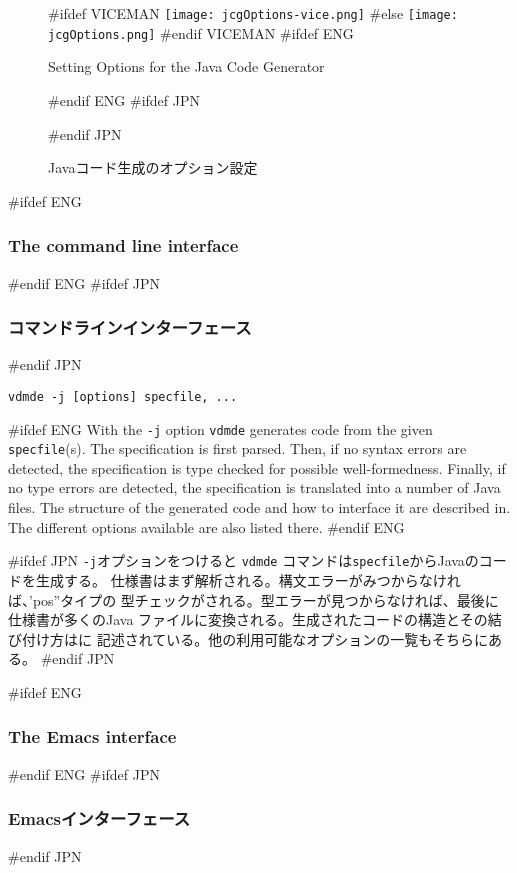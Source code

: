 \documentclass[\pformat,12pt]{article}
\newcommand{\vdmde}{vdmde}
\newcommand{\vdmde}{vppde}
\begin{document}
\begin{figure}[tbh]
\begin{center}
#ifdef VICEMAN
\texttt{[image: jcgOptions-vice.png]}
#else
\texttt{[image: jcgOptions.png]}
#endif VICEMAN
#ifdef ENG
\caption{Setting Options for the Java Code Generator}
#endif ENG
#ifdef JPN
\caption{Javaコード生成のオプション設定}
#endif JPN
\label{fig:optjcg}
\end{center}
\end{figure}

#ifdef ENG
\subsubsection{The command line interface}
#endif ENG
#ifdef JPN
\subsubsection{コマンドラインインターフェース}
#endif JPN

{\tt \vdmde\ -j [options] specfile, ...}

#ifdef ENG
With the {\tt -j} option {\tt \vdmde} generates code from the given
{\tt specfile}(s). The specification is first parsed. Then, if no
syntax errors are detected, the specification is type checked for
possible well-formedness. Finally,
if no type errors are detected, the specification is translated into a
number of Java files. The structure of the generated
code and how to interface it are described in\cite{CGJavaManPP-CSK}. The
different options available are also listed there.
#endif ENG

#ifdef JPN
{\tt -j}オプションをつけると {\tt \vdmde} コマンドは{\tt specfile}からJavaのコードを生成する。
仕様書はまず解析される。構文エラーがみつからなければ、'pos''タイプの 
型チェックがされる。型エラーが見つからなければ、最後に仕様書が多くのJava
ファイルに変換される。生成されたコードの構造とその結び付け方は\cite{CGJavaManPP-CSK}に
記述されている。他の利用可能なオプションの一覧もそちらにある。
#endif JPN

#ifdef ENG
\subsubsection{The Emacs interface}
#endif ENG
#ifdef JPN
\subsubsection{Emacsインターフェース}
#endif JPN
\end{document}
